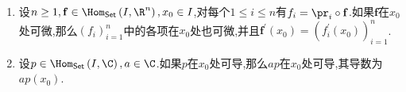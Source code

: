 \begin{example}{}{}
	\begin{enumerate}
		\item 设$n\geq 1,\mathbf{f}\in\Hom_{\mathsf{Set}}\left(I,\R^{n}\right),x_{0}\in I$,对每个$1\leq i\leq n$有$f_{i}=\pr_{i}\circ\mathbf{f}$.如果$\mathbf{f}$在$x_{0}$处可微,那么$\left(f_{i}\right)_{i=1}^{n}$中的各项在$x_{0}$处也可微,并且$\mathbf{f}^{\prime}\left(x_{0}\right)=\left(f_{i}^{\prime}\left(x_{0}\right)\right)_{i=1}^{n}$.
		\item 设$p\in\Hom_{\mathsf{Set}}\left(I,\C\right),a\in\C$.如果$p$在$x_{0}$处可导,那么$ap$在$x_{0}$处可导,其导数为$ap\left(x_{0}\right)$.
	\end{enumerate}
\end{example}



























